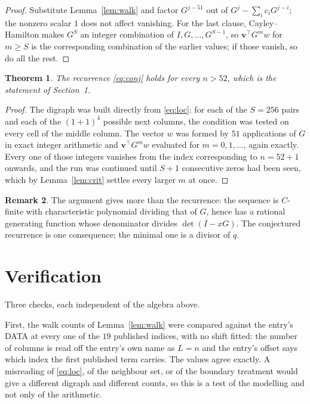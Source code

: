 \documentclass[11pt,a4paper]{article}
\theoremstyle{plain}
\newtheorem{theorem}{Theorem}
\theoremstyle{definition}
\newtheorem{remark}[theorem]{Remark}
\begin{document}
\begin{proof}
Substitute Lemma~\ref{lem:walk} and factor $G^{j-51}$ out of
$G^{j}-\sum_ic_iG^{j-i}$; the nonzero scalar $1$ does not affect
vanishing. For the last clause, Cayley--Hamilton makes $G^{S}$ an integer combination of
$I,G,\dots,G^{S-1}$, so $\mathbf{v}^{\!\top}G^{m}w$ for $m\ge S$ is the corresponding
combination of the earlier values; if those vanish, so do all the rest.
\end{proof}

\begin{theorem}
The recurrence \eqref{eq:conj} holds for every $n>52$, which is the statement of
Section~1.
\end{theorem}

\begin{proof}
The digraph was built directly from \eqref{eq:loc}: for each of the $S=256$ pairs and each
of the $(1+1)^{4}$ possible next columns, the condition was tested on every cell of
the middle column. The vector $w$ was formed by $51$ applications of $G$ in exact integer
arithmetic and $\mathbf{v}^{\!\top}G^{m}w$ evaluated for $m=0,1,\dots$, again exactly.
Every one of those integers vanishes from the index corresponding to $n=52+1$ onwards,
and the run was continued until $S+1$ consecutive zeros had been seen, which by
Lemma~\ref{lem:crit} settles every larger $m$ at once.
\end{proof}

\begin{remark}
The argument gives more than the recurrence: the sequence is $C$-finite with characteristic
polynomial dividing that of $G$, hence has a rational generating function whose denominator
divides $\det(I-xG)$. The conjectured recurrence is one consequence; the minimal one is a
divisor of $q$.
\end{remark}

\section{Verification}

Three checks, each independent of the algebra above.

First, the walk counts of Lemma~\ref{lem:walk} were compared against the entry's DATA at
every one of the $19$ published indices, with no shift fitted: the number of columns is
read off the entry's own name as $L=n$ and the entry's offset says which index the first
published term carries. The values agree exactly. A misreading of \eqref{eq:loc}, of the
neighbour set, or of the boundary treatment would give a different digraph and different
counts, so this is a test of the modelling and not only of the arithmetic.
\end{document}
